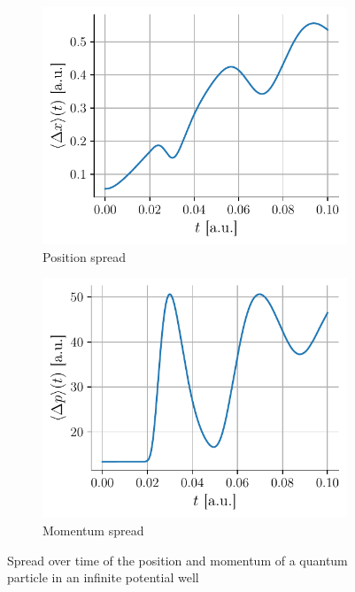 \begin{figure}[h]
    \centering
    \begin{subfigure}{0.48\linewidth}
        \centering
        \includegraphics[width=\linewidth]{figures/i_deltax.pdf}
        \caption{Position spread}
        \label{fig:i_deltax}
    \end{subfigure}
    \begin{subfigure}{0.48\linewidth}
        \centering
        \includegraphics[width=\linewidth]{figures/i_deltap.pdf}
        \caption{Momentum spread}
        \label{fig:i_deltap}
    \end{subfigure}
    \caption{Spread over time of the position and momentum of a quantum particle in an infinite potential well}
    \label{fig:i_deltax_deltap}
\end{figure}

